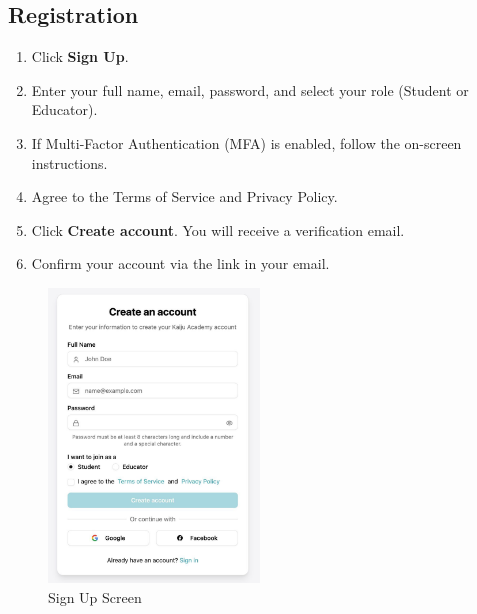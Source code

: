 \documentclass[a4paper,11pt]{scrartcl}
\begin{document}
\subsection{Registration}
\begin{enumerate}[leftmargin=*]
    \item Click \textbf{Sign Up}.
    \item Enter your full name, email, password, and select your role (Student or Educator).
    \item If Multi-Factor Authentication (MFA) is enabled, follow the on-screen instructions.
    \item Agree to the Terms of Service and Privacy Policy.
    \item Click \textbf{Create account}. You will receive a verification email.
    \item Confirm your account via the link in your email.
\end{enumerate}
\begin{figure}[H]
    \centering
    \includegraphics[width=0.5\textwidth]{SignUp.jpg}
    \caption{Sign Up Screen}
\end{figure}
\end{document}

